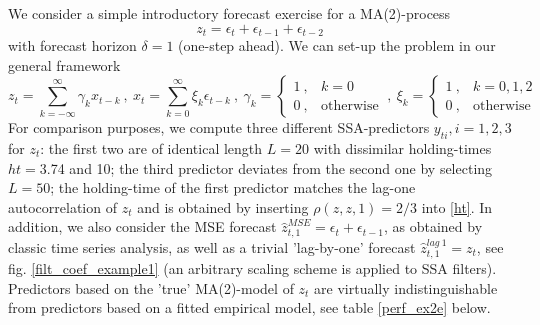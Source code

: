 \documentclass[a4paper]{article}
\begin{document}
We consider a simple introductory forecast exercise for a MA(2)-process
\[z_t=\epsilon_t+\epsilon_{t-1}+\epsilon_{t-2}\]
with forecast horizon $\delta=1$ (one-step ahead). We can set-up the problem in our general framework 
\[
z_t=\sum_{k=-\infty}^{\infty}\gamma_k x_{t-k}~,~x_t=\sum_{k=0}^{\infty}\xi_k\epsilon_{t-k}~,~\gamma_k=\left\{\begin{array}{cc}1~,&k=0\\0~,&\textrm{otherwise}\end{array}\right.~,~\xi_k=\left\{\begin{array}{cc}1~,&k=0,1,2\\0~,&\textrm{otherwise}\end{array}\right.
\]
For comparison purposes, we compute three different SSA-predictors $y_{ti},i=1,2,3$ for $z_t$: the first two are of identical length $L=20$ with dissimilar holding-times  $ht=$3.74 and 10; the third predictor deviates from the second one by selecting $L=50$; the holding-time of the first predictor matches the lag-one autocorrelation of $z_t$  and is obtained by inserting $\rho(z,z,1)=2/3$ into \ref{ht}. In addition, we also consider the MSE forecast $\hat{z}_{t,1}^{MSE}=\epsilon_t+\epsilon_{t-1}$, as obtained by classic time series analysis, as well as a trivial 'lag-by-one' forecast $\hat{z}_{t,1}^{lag~1}=z_t$, see fig. \ref{filt_coef_example1} (an arbitrary scaling scheme is applied to SSA filters). Predictors based on the 'true' MA(2)-model of $z_t$ are virtually indistinguishable from predictors based on a fitted empirical model, see table \ref{perf_ex2e} below.  
\end{document}
